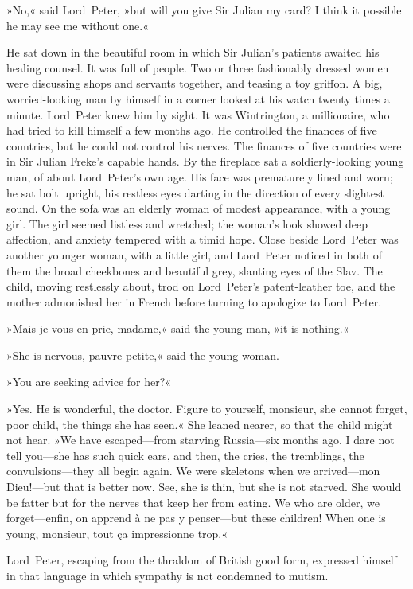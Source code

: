 »No,« said Lord~Peter, »but will you give Sir Julian my card? I think it possible he may see me without one.«

He sat down in the beautiful room in which Sir Julian's patients awaited his healing counsel. It was full of people. Two or three fashionably dressed women were discussing shops and servants together, and teasing a toy griffon. A big, worried-looking man by himself in a corner looked at his watch twenty times a minute. Lord~Peter knew him by sight. It was Wintrington, a millionaire, who had tried to kill himself a few months ago. He controlled the finances of five countries, but he could not control his nerves. The finances of five countries were in Sir Julian Freke's capable hands. By the fireplace sat a soldierly-looking young man, of about Lord~Peter's own age. His face was prematurely lined and worn; he sat bolt upright, his restless eyes darting in the direction of every slightest sound. On the sofa was an elderly woman of modest appearance, with a young girl. The girl seemed listless and wretched; the woman's look showed deep affection, and anxiety tempered with a timid hope. Close beside Lord~Peter was another younger woman, with a little girl, and Lord~Peter noticed in both of them the broad cheekbones and beautiful grey, slanting eyes of the Slav. The child, moving restlessly about, trod on Lord~Peter's patent-leather toe, and the mother admonished her in French before turning to apologize to Lord~Peter.

»Mais je vous en prie, madame,« said the young man, »it is nothing.«

»She is nervous, pauvre petite,« said the young woman.

»You are seeking advice for her?«

»Yes. He is wonderful, the doctor. Figure to yourself, monsieur, she cannot forget, poor child, the things she has seen.« She leaned nearer, so that the child might not hear. »We have escaped—from starving Russia—six months ago. I dare not tell you—she has such quick ears, and then, the cries, the tremblings, the convulsions—they all begin again. We were skeletons when we arrived—mon Dieu!---but that is better now. See, she is thin, but she is not starved. She would be fatter but for the nerves that keep her from eating. We who are older, we forget—enfin, on apprend à ne pas y penser—but these children! When one is young, monsieur, tout ça impressionne trop.«

Lord~Peter, escaping from the thraldom of British good form, expressed himself in that language in which sympathy is not condemned to mutism.

